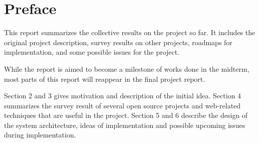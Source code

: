\section{Preface}
\label{ch1}

This report summarizes the collective results on the project so far.
It includes the original project description, survey results on other projects, roadmaps for implementation, and some possible issues for the project.

While the report is aimed to become a milestone of works done in the midterm, most parts of this report will reappear in the final project report.

Section 2 and 3 gives motivation and description of the initial idea. Section 4 summarizes the survey result of several open source projects and web-related techniques that are useful in the project. Section 5 and 6 describe the design of the system architecture, ideas of implementation and possible upcoming issues during implementation.
